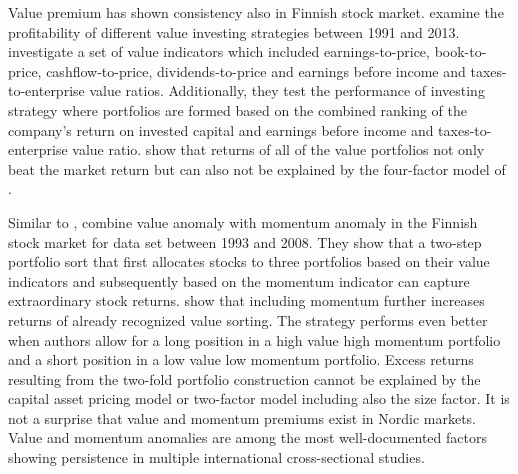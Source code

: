 \documentclass[12pt]{article}
\begin{document}
Value premium has shown consistency also in Finnish stock market. \citet*{Davydov2017MagicFV} examine the profitability of different value investing strategies between 1991 and 2013. \citeauthor{Davydov2017MagicFV} investigate a set of value indicators which included earnings-to-price, book-to-price, cashflow-to-price, dividends-to-price and earnings before income and taxes-to-enterprise value ratios. Additionally, they test the performance of investing strategy where portfolios are formed based on the combined ranking of the company's return on invested capital and earnings before income and taxes-to-enterprise value ratio. \citet{Davydov2017MagicFV} show that returns of all of the value portfolios not only beat the market return but can also not be explained by the four-factor model of \citet{Carhart1997}. \footnotemark {}  \par


Similar to \citet{grobys}, \citet{leivo2011} combine value anomaly with momentum anomaly in the Finnish stock market for data set between 1993 and 2008. They show that a two-step portfolio sort that first allocates stocks to three portfolios based on their value indicators and subsequently based on the momentum indicator can capture extraordinary stock returns. \citeauthor{leivo2011} show that including momentum further increases returns of already recognized value sorting. The strategy performs even better when authors allow for a long position in a high value high momentum portfolio and a short position in a low value low momentum portfolio. Excess returns resulting from the two-fold portfolio construction cannot be explained by the capital asset pricing model or two-factor model including also the size factor. It is not a surprise that value and momentum premiums exist in Nordic markets.\footnotemark {} Value and momentum anomalies are among the most well-documented factors showing persistence in multiple international cross-sectional studies.\footnotemark {} \par
\end{document}
